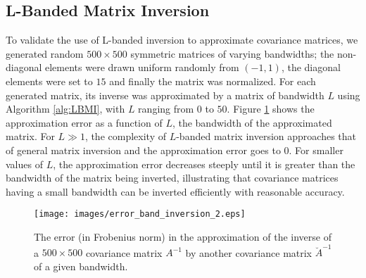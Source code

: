 \documentclass[twocolumn]{article}
\theoremstyle{plain}
\theoremstyle{definition}
\theoremstyle{definition}
\theoremstyle{remark}
\begin{document}
\subsection{L-Banded Matrix Inversion}
To validate the use of L-banded inversion to approximate covariance matrices, we generated random $500 \times 500$ symmetric matrices of varying bandwidths; the non-diagonal elements were drawn uniform randomly from $(-1,1)$, the diagonal elements were set to $15$ and finally the matrix was normalized.
For each generated matrix, its inverse was approximated by a matrix of bandwidth $L$ using Algorithm \ref{alg:LBMI}, with $L$ ranging from $0$ to $50$. Figure \ref{band_inversion} shows the approximation error as a function of $L$, the bandwidth of the approximated matrix. For $L\gg 1$, the complexity of $L$-banded matrix inversion approaches that of general matrix inversion and the approximation error goes to 0. For smaller values of $L$, the approximation error decreases steeply until it is greater than the bandwidth of the matrix being inverted, illustrating that covariance matrices having a small bandwidth can be inverted efficiently with reasonable accuracy.
\begin{figure}[h]
\texttt{[image: images/error\_band\_inversion\_2.eps]}
\caption{The error (in Frobenius norm) in the approximation of the inverse of a $500\times 500$ covariance matrix $A^{-1}$ by another covariance matrix $\breve A^{-1}$ of a given bandwidth.}
\label{band_inversion}
\end{figure}
\end{document}
